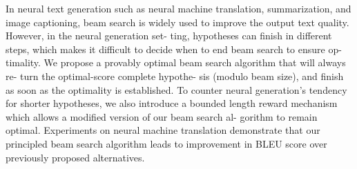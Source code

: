 In neural text generation such as neural machine translation, summarization, and image captioning, beam search is widely used to improve the output text quality. However, in the neural generation set- ting, hypotheses can finish in different steps, which makes it difficult to decide when to end beam search to ensure op- timality. We propose a provably optimal beam search algorithm that will always re- turn the optimal-score complete hypothe- sis (modulo beam size), and finish as soon as the optimality is established. To counter neural generation's tendency for shorter hypotheses, we also introduce a bounded length reward mechanism which allows a modified version of our beam search al- gorithm to remain optimal. Experiments on neural machine translation demonstrate that our principled beam search algorithm leads to improvement in BLEU score over previously proposed alternatives.
